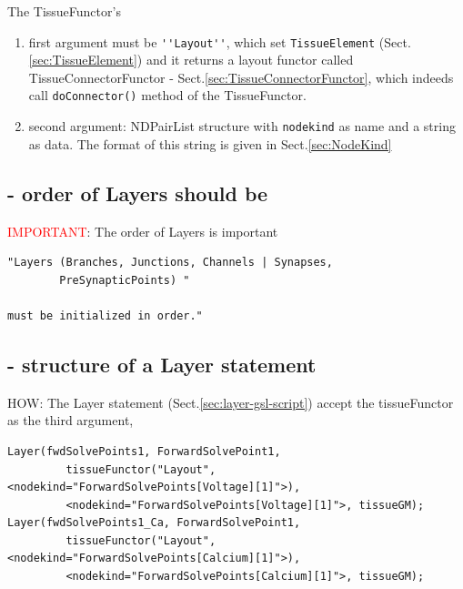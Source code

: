 The TissueFunctor's 
\begin{enumerate}
  \item  first argument must be \verb!''Layout''!, which set
\verb!TissueElement! (Sect.\ref{sec:TissueElement}) and it returns a layout functor called
TissueConnectorFunctor - Sect.\ref{sec:TissueConnectorFunctor}, which indeeds
call \verb!doConnector()! method of the TissueFunctor.
  
  \item second argument: NDPairList structure with
  \verb!nodekind! as name and a string as data. The format of this string is
  given in Sect.\ref{sec:NodeKind}
  
\end{enumerate}

\subsection{- order of Layers should be}

\textcolor{red}{IMPORTANT}: The order of Layers is important
\begin{verbatim}
"Layers (Branches, Junctions, Channels | Synapses, 
        PreSynapticPoints) "
    
must be initialized in order."
\end{verbatim}


\subsection{- structure of a Layer statement}

HOW: The Layer statement (Sect.\ref{sec:layer-gsl-script}) accept the
tissueFunctor as the third argument,
\begin{verbatim}
Layer(fwdSolvePoints1, ForwardSolvePoint1, 
         tissueFunctor("Layout", <nodekind="ForwardSolvePoints[Voltage][1]">), 
         <nodekind="ForwardSolvePoints[Voltage][1]">, tissueGM);
Layer(fwdSolvePoints1_Ca, ForwardSolvePoint1, 
         tissueFunctor("Layout", <nodekind="ForwardSolvePoints[Calcium][1]">), 
         <nodekind="ForwardSolvePoints[Calcium][1]">, tissueGM);
\end{verbatim}  


